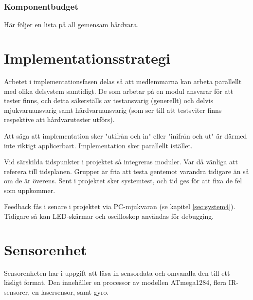 \documentclass[a4paper,11pt]{article}
\begin{document}
\subsubsection{Komponentbudget}
Här följer en lista på all gemensam hårdvara.

\begin{center}
\begin{HardwareList}
\end{HardwareList}
\end{center}

\clearpage
\section{Implementationsstrategi}
Arbetet i implementationsfasen delas så att medlemmarna kan arbeta parallellt med olika delsystem samtidigt. De som arbetar på en modul ansvarar för att tester finns, och detta säkerställs av testansvarig (generellt) och delvis mjukvaruansvarig samt hårdvaruansvarig (som ser till att testsviter finns respektive att hårdvarutester utförs).

Att säga att implementation sker "utifrån och in" eller "inifrån och ut" är därmed inte riktigt applicerbart. Implementation sker parallellt istället.

Vid särskilda tidspunkter i projektet så integreras moduler. Var då vänliga att referera till tidsplanen. Grupper är fria att testa gentemot varandra tidigare än så om de är överens. Sent i projektet sker systemtest, och tid ges för att fixa de fel som uppkommer.

Feedback fås i senare i projektet via PC-mjukvaran (se kapitel \ref{sec:system4}). Tidigare så kan LED-skärmar och oscilloskop användas för debugging.


\clearpage
\section{Sensorenhet}\label{sec:system1}
Sensorenheten har i uppgift att läsa in sensordata och omvandla den till ett läsligt format. Den innehåller en processor av modellen ATmega1284, flera IR-sensorer, en lasersensor, samt gyro.
\end{document}
